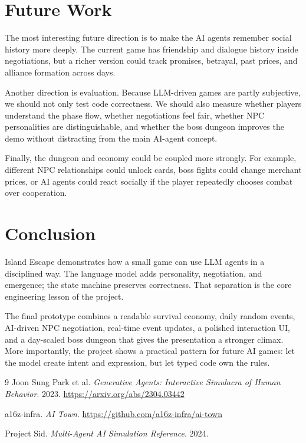 \documentclass[11pt]{article}
\begin{document}
\section{Future Work}

The most interesting future direction is to make the AI agents remember social
history more deeply. The current game has friendship and dialogue history inside
negotiations, but a richer version could track promises, betrayal, past prices,
and alliance formation across days.

Another direction is evaluation. Because LLM-driven games are partly subjective,
we should not only test code correctness. We should also measure whether players
understand the phase flow, whether negotiations feel fair, whether NPC
personalities are distinguishable, and whether the boss dungeon improves the
demo without distracting from the main AI-agent concept.

Finally, the dungeon and economy could be coupled more strongly. For example,
different NPC relationships could unlock cards, boss fights could change
merchant prices, or AI agents could react socially if the player repeatedly
chooses combat over cooperation.

\section{Conclusion}

Island Escape demonstrates how a small game can use LLM agents in a disciplined
way. The language model adds personality, negotiation, and emergence; the
state machine preserves correctness. That separation is the core engineering
lesson of the project.

The final prototype combines a readable survival economy, daily random events,
AI-driven NPC negotiation, real-time event updates, a polished interaction UI,
and a day-scaled boss dungeon that gives the presentation a stronger climax.
More importantly, the project shows a practical pattern for future AI games: let
the model create intent and expression, but let typed code own the rules.

\begin{thebibliography}{9}
Joon Sung Park et al.
\textit{Generative Agents: Interactive Simulacra of Human Behavior}.
2023. \url{https://arxiv.org/abs/2304.03442}

a16z-infra.
\textit{AI Town}. \url{https://github.com/a16z-infra/ai-town}

Project Sid. \textit{Multi-Agent AI Simulation Reference}. 2024.
\end{thebibliography}
\end{document}
